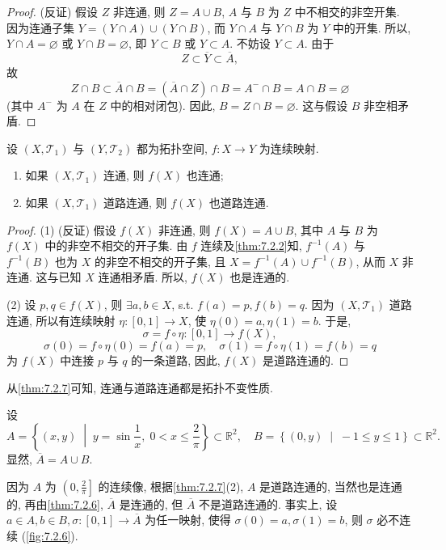 \begin{proof}
(反证) 假设 $Z$ 非连通, 则 $Z = A \cup B$, $A$ 与 $B$ 为 $Z$ 中不相交的非空开集. 因为连通子集 $Y = (Y \cap A) \cup (Y \cap B)$, 而 $Y \cap A$ 与 $Y \cap B$ 为 $Y$ 中的开集. 所以, $Y \cap A = \varnothing$ 或 $Y \cap B = \varnothing$, 即 $Y \subset B$ 或 $Y \subset A$. 不妨设 $Y \subset A$. 由于
\[
  Z \subset \overline{Y} \subset \overline{A},
\]
故
\[
  Z \cap B \subset \overline{A} \cap B = (\overline{A} \cap Z) \cap B = A^{-} \cap B = A \cap B = \varnothing
\]
(其中 $A^{-}$ 为 $A$ 在 $Z$ 中的相对闭包). 因此, $B = Z \cap B = \varnothing$. 这与假设 $B$ 非空相矛盾.
\end{proof}

\begin{theorem}\label{thm:7.2.7}
设 $(X, \mathcal{T}_{1})$ 与 $(Y, \mathcal{T}_{2})$ 都为拓扑空间, $f\colon X \to Y$ 为连续映射.
\begin{enumerate}
  \item 如果 $(X, \mathcal{T}_{1})$ 连通, 则 $f(X)$ 也连通;
  \item 如果 $(X, \mathcal{T}_{1})$ 道路连通, 则 $f(X)$ 也道路连通.
\end{enumerate}
\end{theorem}

\begin{proof}
(1) (反证) 假设 $f(X)$ 非连通, 则 $f(X) = A \cup B$, 其中 $A$ 与 $B$ 为 $f(X)$ 中的非空不相交的开子集. 由 $f$ 连续及\cref{thm:7.2.2}知, $f^{-1}(A)$ 与 $f^{-1}(B)$ 也为 $X$ 的非空不相交的开子集, 且 $X = f^{-1}(A) \cup f^{-1}(B)$, 从而 $X$ 非连通. 这与已知 $X$ 连通相矛盾. 所以, $f(X)$ 也是连通的.

(2) 设 $p, q \in f(X)$, 则 $\exists a, b \in X$, s.t. $f(a) = p, f(b) = q$. 因为 $(X, \mathcal{T}_1)$ 道路连通, 所以有连续映射 $\eta\colon [0, 1] \to X$, 使 $\eta(0) = a, \eta(1) = b$. 于是,
\[
  \sigma = f \circ \eta\colon [0, 1] \to f(X),
\]
\[
  \sigma(0) = f \circ \eta(0) = f(a) = p, \quad \sigma(1) = f \circ \eta(1) = f(b) = q
\]
为 $f(X)$ 中连接 $p$ 与 $q$ 的一条道路, 因此, $f(X)$ 是道路连通的.
\end{proof}

从\cref{thm:7.2.7}可知, 连通与道路连通都是拓扑不变性质.

\begin{example}\label{ex:7.2.5}
设
\[
  A = \left\{(x,y) \;\middle|\; y = \sin\frac{1}{x}, \; 0 < x \leqslant \frac{2}{\pi}\right\} \subset \mathbb{R}^{2}, \quad B = \left\{(0,y) \;\middle|\; -1 \leqslant y \leqslant 1\right\} \subset \mathbb{R}^{2}.
\]
显然, $\overline{A} = A \cup B$.

因为 $A$ 为 $\left(0, \frac{2}{\pi}\right]$ 的连续像, 根据\cref{thm:7.2.7}(2), $A$ 是道路连通的, 当然也是连通的, 再由\cref{thm:7.2.6}, $\overline{A}$ 是连通的, 但 $\overline{A}$ 不是道路连通的. 事实上, 设 $a \in A, b \in B, \sigma\colon [0,1] \to \overline{A}$ 为任一映射, 使得 $\sigma(0) = a, \sigma(1) = b$, 则 $\sigma$ 必不连续 (\cref{fig:7.2.6}).
\end{example}


